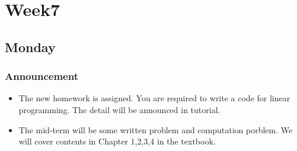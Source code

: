 
\chapter{Week7}

\section{Monday}
\subsection{Announcement}
\begin{itemize}
\item
The new homework is assigned. You are required to write a code for linear programming. The detail will be announced in tutorial.
\item
The mid-term will be some written problem and computation porblem. We will cover contents in Chapter 1,2,3,4 in the textbook. 
\end{itemize}
